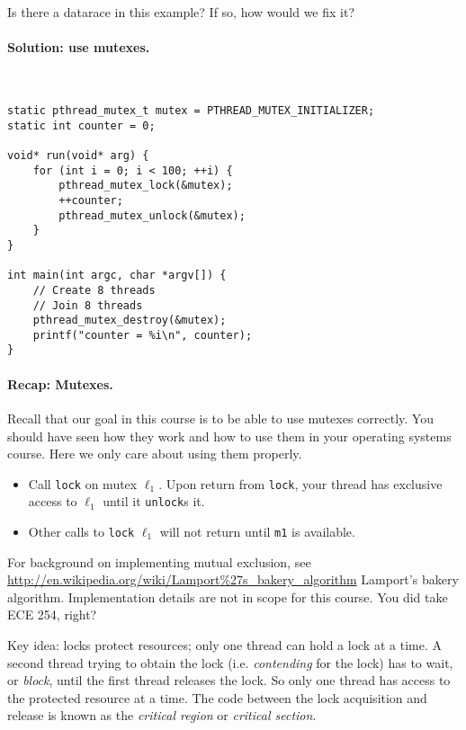 Is there a datarace in this example? If so, how would we fix it?

\paragraph{Solution: use mutexes.}~

  \begin{verbatim}
static pthread_mutex_t mutex = PTHREAD_MUTEX_INITIALIZER;
static int counter = 0;

void* run(void* arg) {
    for (int i = 0; i < 100; ++i) {
        pthread_mutex_lock(&mutex);
        ++counter;
        pthread_mutex_unlock(&mutex);
    }
}

int main(int argc, char *argv[]) {
    // Create 8 threads
    // Join 8 threads
    pthread_mutex_destroy(&mutex);
    printf("counter = %i\n", counter);
}
  \end{verbatim}
  
  
\paragraph{Recap: Mutexes.} Recall that our goal in this course is
to be able to use mutexes correctly. 
You should have seen how they work and how to use them in your operating systems course. Here we only care about using them properly.

\begin{itemize}
\item Call {\tt lock} on mutex $\ell_1$. Upon return from
      {\tt lock}, your thread has exclusive access to $\ell_1$ until it
      {\tt unlock}s it.
\item Other calls to {\tt lock} $\ell_1$ will not return
      until {\tt m1} is available.
\end{itemize}

 For background on implementing mutual exclusion, see
 \url{http://en.wikipedia.org/wiki/Lamport\%27s_bakery_algorithm}
      {Lamport's bakery algorithm}. Implementation details are not in
      scope for this course. You did take ECE 254, right?

Key idea: locks protect resources; only one thread
can hold a lock at a time. A second thread trying to obtain the lock
(i.e. \emph{contending} for the lock) has to wait, or \emph{block},
until the first thread releases the lock. So only one thread has
access to the protected resource at a time. The code between the lock
acquisition and release is known as the \emph{critical region} or \emph{critical section}.

